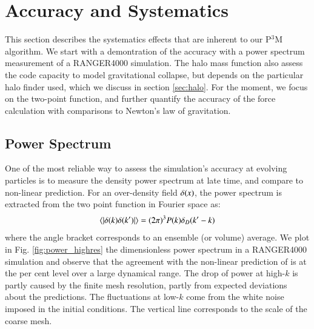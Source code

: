 \section{Accuracy and Systematics}
\label{sec:accuracy}
 
 This section describes the systematics effects that are inherent to our P$^{3}$M algorithm.
 We start with a demontration of the accuracy with a power spectrum measurement of a RANGER4000 simulation. 
 The halo mass function also assess the code capacity to model gravitational collapse, 
 but depends on the particular halo finder used, which we discuss in section \ref{sec:halo}.
 For the moment, we focus on the two-point function, and further quantify the accuracy of the force calculation
 with comparisons to Newton's law of gravitation.
 
 
 \subsection{Power Spectrum}
 \label{subsec:powerspectrum}
 
One of the most reliable way to assess the simulation's accuracy at evolving particles
is to measure the density power spectrum at late time, and compare to non-linear prediction. 
For an over-density field $\delta({\bf \it x})$, the power spectrum is extracted from the two point function in Fourier space as:
\begin{eqnarray}
\langle | \delta ({\bf \it k}) \delta ({\bf \it k'}) | \rangle = (2\pi)^{3}P(k)\delta_{D}({\bf \it k'} - {\bf \it k})
\label{eq:power}
\end{eqnarray}
where the angle bracket corresponds to an ensemble (or volume) average.
We plot in Fig. \ref{fig:power_highres} the dimensionless power spectrum in a RANGER4000 simulation and
observe that the agreement with the non-linear prediction of \cite{Lewis:1999bs} is at the per cent level over a large dynamical range.
The drop of power at high-$k$ is partly caused by the finite mesh resolution, partly from expected deviations about the predictions.
The fluctuations at low-$k$ come from the white noise imposed in the initial conditions. The vertical line corresponds to the scale of the coarse mesh.

